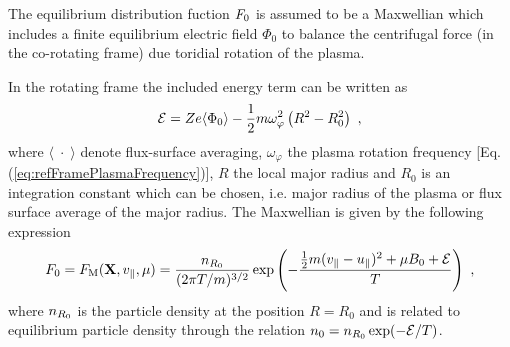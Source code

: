 The equilibrium distribution fuction $F_0$ is assumed to be a Maxwellian which includes a finite equilibrium electric field $\Phi_0$ to balance the centrifugal force (in the co-rotating frame) due toridial rotation of the plasma. 

In the rotating frame the included energy term can be written as 
\begin{gather}
	\mathcal{E} = Z e \langle \Phi_0 \rangle - \frac{1}{2} m \omega_\varphi^2 \left(R^2 - R_0^2\right)~,
	\label{eq:rotEnergy}
\end{gather}
where $\langle\;\cdot\;\rangle$ denote flux-surface averaging, $\omega_\varphi$ the plasma rotation frequency [Eq. (\ref{eq:refFramePlasmaFrequency})], $R$ the local major radius and $R_0$ is an integration constant which can be chosen, i.e. major radius of the plasma or flux surface average of the major radius. The Maxwellian is given by the following expression
\begin{gather}
	F_0 = F_\mathrm{M}(\boldsymbol{\mathbf{X}}, v_\parallel, \mu) = \frac{n_{R_0}}{(2\pi T/m)^{3/2}}\exp\left(-\frac{\frac{1}{2} m (v_\parallel - u_\parallel)^2 + \mu B_0 + \mathcal{E}}{T}\right)~,
	\label{eq:maxwellian}
\end{gather}   
where $n_{R_0}$ is the particle density at the position $R = R_0$ and is related to equilibrium particle density through the relation $n_0 = n_{R_0} \exp(-\mathcal{E}/T)$. \cite{Peeters2009B} 

